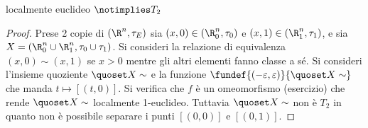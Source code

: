 \begin{prop}
localmente euclideo $\notimplies T_2$
\end{prop}
\begin{proof}
Prese 2 copie di $(\R^n, \tau _E)$ sia $(x,0) \in (\R^n_0, \tau _0)$  e $(x,1) \in (\R^n_1, \tau _1)$, e sia $X = (\R^n_0 \cup \R^n_1, \tau _0 \cup \tau _1)$. Si consideri la relazione di equivalenza $(x,0)\sim(x,1)$ se $x>0$ mentre gli altri elementi fanno classe a sé. Si consideri l'insieme quoziente $\quoset X\sim$  e la funzione $\fundef{(-\varepsilon,\varepsilon)}{\quoset X\sim}$ che manda $t \mapsto [(t,0)]$. Si verifica che $f$ è un omeomorfismo (esercizio) che rende $\quoset X\sim$ localmente 1-euclideo. Tuttavia $\quoset X\sim$ non è $T_2$ in quanto non è possibile separare i punti $[(0,0)]$ e $[(0,1)].$
\end{proof}



